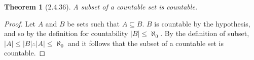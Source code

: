 \documentclass[a4paper, 12pt]{article}
\theoremstyle{plain}
\newtheorem*{theorem*}{Theorem}
\begin{document}
	
	\begin{theorem*}[2.4.36]
		A subset of a countable set is countable.
	\end{theorem*}
	
	\begin{proof}
		Let $A$ and $B$ be sets such that $A \subseteq B$. $B$ is countable by the hypothesis, and so by the definition for countability $|B| \le \aleph_0$. By the definition of subset, $|A| \le |B| \therefore |A| \le \aleph_0$ and it follows that the subset of a countable set is countable.
	\end{proof}
\end{document}
